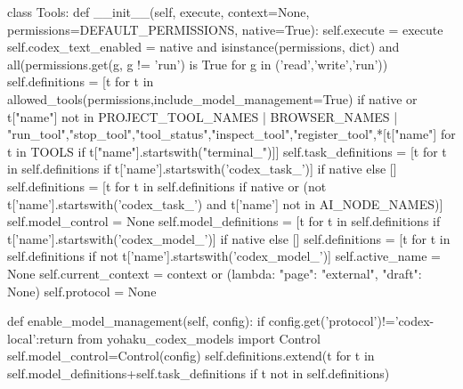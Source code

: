class Tools:
    def __init__(self, execute, context=None, permissions=DEFAULT_PERMISSIONS, native=True):
        self.execute = execute
        self.codex_text_enabled = native and isinstance(permissions, dict) and all(permissions.get(g, g != 'run') is True for g in ('read','write','run'))
        self.definitions = [t for t in allowed_tools(permissions,include_model_management=True) if native or t["name"] not in PROJECT_TOOL_NAMES | BROWSER_NAMES | {"run_tool","stop_tool","tool_status","inspect_tool","register_tool",*[t["name"] for t in TOOLS if t["name"].startswith("terminal_")]}]
        self.task_definitions = [t for t in self.definitions if t['name'].startswith('codex_task_')] if native else []
        self.definitions = [t for t in self.definitions if native or (not t['name'].startswith('codex_task_') and t['name'] not in AI_NODE_NAMES)]
        self.model_control = None
        self.model_definitions = [t for t in self.definitions if t['name'].startswith('codex_model_')] if native else []
        self.definitions = [t for t in self.definitions if not t['name'].startswith('codex_model_')]
        self.active_name = None
        self.current_context = context or (lambda: {"page": "external", "draft": None})
        self.protocol = None

    def enable_model_management(self, config):
        if config.get('protocol')!='codex-local':return
        from yohaku_codex_models import Control
        self.model_control=Control(config)
        self.definitions.extend(t for t in self.model_definitions+self.task_definitions if t not in self.definitions)

